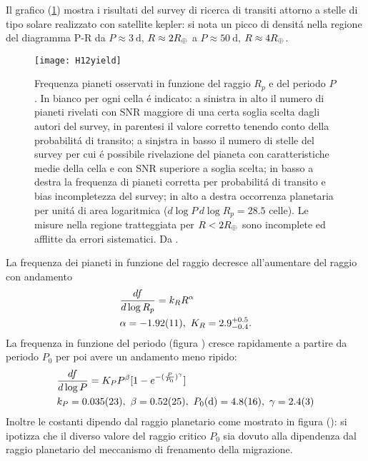 Il grafico (\ref{fig:H12yield}) mostra i risultati del survey di ricerca di transiti attorno a stelle di tipo solare realizzato con satellite kepler: si nota un picco di densit\'a nella regione del diagramma P-R da $P\approx\SI{3}{\day}$, $R\approx2\rearth$ a $P\approx\SI{50}{\day}$, $R\approx4\rearth$.

\begin{figure}[!ht]
	\centering
	\texttt{[image: H12yield]}
	\caption{Frequenza pianeti osservati in funzione del raggio $R_p$ e del periodo $P$. In bianco per ogni cella \'e indicato: a sinistra in alto il numero di pianeti rivelati con SNR maggiore di una certa soglia scelta dagli autori del survey, in parentesi il valore corretto tenendo conto della probabilit\'a di transito; a sinjstra in basso il numero di stelle del survey per cui \'e possibile rivelazione del pianeta con caratteristiche medie della cella e con SNR superiore a soglia scelta; in basso a destra la frequenza di pianeti corretta per probabilit\'a di transito e bias incompletezza del survey; in alto a destra occorrenza planetaria per unit\'a di area logaritmica ($d\log{P}\,d\log{R_p}=28.5$ celle). Le misure nella regione tratteggiata per $R<2\rearth{}$ sono incomplete ed afflitte da errori sistematici. Da \cite{howard2012planet}.}\label{fig:H12yield}
\end{figure}


La frequenza dei pianeti in funzione del raggio decresce all'aumentare del raggio con andamento
\begin{equation}
\begin{aligned}
&\TDy{\log{R_p}}{f}=k_RR\expy{\alpha}\\
&\alpha=\num{-1.92+-0.11},\ K_R=2.9_{-0.4}^{+0.5}.
\end{aligned}
\end{equation}
La frequenza in funzione del periodo (figura ) cresce rapidamente a partire da periodo $P_0$ per poi avere un andamento meno ripido:
\begin{equation}
\begin{aligned}
&\TDy{\log{P}}{f}=K_PP\expy{\beta}[1-\exp{-(\frac{P}{P_0})\expy{\gamma}}]\\
&k_P=\num{0.035+-0.023},\ \beta=\num{0.52+-0.25},\ P_0(\si{\day})=\num{4.8+-1.6},\ \gamma=\num{2.4+-0.3}
\end{aligned}
\end{equation}
Inoltre le costanti dipendo dal raggio planetario come mostrato in figura (): si ipotizza che il diverso valore del raggio critico $P_0$ sia dovuto alla dipendenza dal raggio planetario del meccanismo di frenamento della migrazione.

